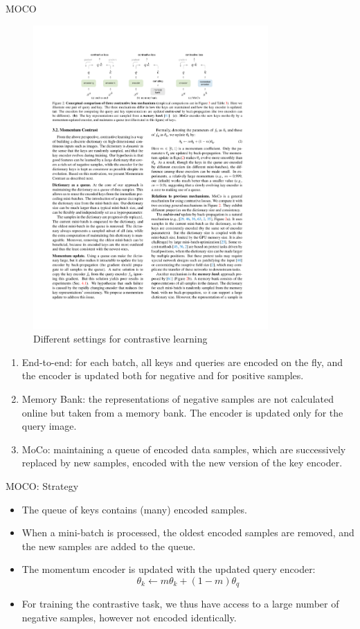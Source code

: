 \documentclass[xcolor=pdftex,dvipsnames,table]{beamer}
\begin{document}
\begin{frame}{MOCO}
\begin{figure}[htb]
    \centering
    \includegraphics[width=0.8\textwidth]{../graphics/moco_settings.pdf}
    \caption{Different settings for contrastive learning \cite{He2020}}
 \end{figure}
\begin{enumerate}
   \item End-to-end: for each batch, all keys and queries are encoded on the fly, and the encoder is updated both for negative and for positive samples.
   \item Memory Bank: the representations of negative samples are not calculated online but taken from a memory bank. The encoder is updated only for the query image.  
   \item MoCo: maintaining a queue of encoded data samples, which are successively replaced by new samples, encoded with the new version of the key encoder.  
\end{enumerate}
\end{frame}

\begin{frame}{MOCO: Strategy}
\begin{itemize}
   \item The queue of keys contains (many) encoded samples. 
   \item When a mini-batch is processed, the oldest encoded samples are removed, and the new samples are added to the queue. 
   \item The momentum encoder is updated with the updated query encoder:
   \begin{equation}
      \theta_k \leftarrow m\theta_k + (1-m)\theta_q
   \end{equation}
   \item For training the contrastive task, we thus have access to a large number of negative samples, however not encoded identically.  
\end{itemize}
\end{frame}
\end{document}
